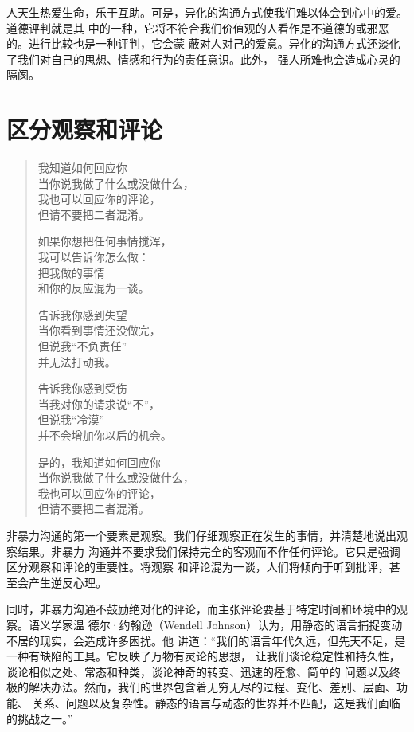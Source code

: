 \documentclass{ctexart}
\newcommand{\person}[1]{%
\nopagebreak{\raggedleft\small ------#1\par}}
\begin{document}
人天生热爱生命，乐于互助。可是，异化的沟通方式使我们难以体会到心中的爱。道德评判就是其
中的一种，它将不符合我们价值观的人看作是不道德的或邪恶的。进行比较也是一种评判，它会蒙
蔽对人对己的爱意。异化的沟通方式还淡化了我们对自己的思想、情感和行为的责任意识。此外，
强人所难也会造成心灵的隔阂。

\section{区分观察和评论}\label{sec:区分观察和评论}

\begin{verse}
	我知道如何回应你\\
	当你说我做了什么或没做什么，\\
	我也可以回应你的评论，\\
	但请不要把二者混淆。

	如果你想把任何事情搅浑，\\
	我可以告诉你怎么做：\\
	把我做的事情\\
	和你的反应混为一谈。

	告诉我你感到失望\\
	当你看到事情还没做完，\\
	但说我``不负责任''\\
	并无法打动我。

	告诉我你感到受伤\\
	当我对你的请求说``不''，\\
	但说我``冷漠''\\
	并不会增加你以后的机会。

	是的，我知道如何回应你\\
	当你说我做了什么或没做什么，\\
	我也可以回应你的评论，\\
	但请不要把二者混淆。\\

	\person{------马歇尔·卢森堡}
\end{verse}

非暴力沟通的第一个要素是观察。我们仔细观察正在发生的事情，并清楚地说出观察结果。非暴力
沟通并不要求我们保持完全的客观而不作任何评论。它只是强调区分观察和评论的重要性。将观察
和评论混为一谈，人们将倾向于听到批评，甚至会产生逆反心理。

同时，非暴力沟通不鼓励绝对化的评论，而主张评论要基于特定时间和环境中的观察。语义学家温
德尔·约翰逊（Wendell Johnson）认为，用静态的语言捕捉变动不居的现实，会造成许多困扰。他
讲道：``我们的语言年代久远，但先天不足，是一种有缺陷的工具。它反映了万物有灵论的思想，
让我们谈论稳定性和持久性，谈论相似之处、常态和种类，谈论神奇的转变、迅速的痊愈、简单的
问题以及终极的解决办法。然而，我们的世界包含着无穷无尽的过程、变化、差别、层面、功能、
关系、问题以及复杂性。静态的语言与动态的世界并不匹配，这是我们面临的挑战之一。''
\end{document}
